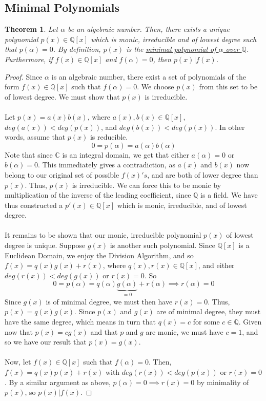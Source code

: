 \documentclass{article}
\newcommand{\C}{\mathbb{C}}
\newcommand{\Q}{\mathbb{Q}}
\newtheorem{theorem}{Theorem}[subsection]
\begin{document}
\subsection{Minimal Polynomials}
\begin{theorem}
Let $\alpha$ be an algebraic number. Then, there exists a unique polynomial $p(x)\in\Q[x]$ which is monic, irreducible and of lowest degree such that $p(\alpha)=0$. By definition, $p(x)$ is the \underline{minimal polynomial of $\alpha$ over $\Q$}. Furthermore, if $f(x)\in\Q[x]$ and $f(\alpha)=0$, then $p(x)|f(x)$.
\end{theorem}
\begin{proof}
Since $\alpha$ is an algebraic number, there exist a set of polynomials of the form $f(x)\in\Q[x]$ such that $f(\alpha)=0$. We choose $p(x)$ from this set to be of lowest degree. We must show that $p(x)$ is irreducible.\\
\\
Let $p(x)=a(x)b(x)$, where $a(x),b(x)\in\Q[x]$, $deg(a(x))<deg(p(x))$, and $deg(b(x))<deg(p(x))$. In other words, assume that $p(x)$ is reducible.
$$0=p(\alpha)=a(\alpha)b(\alpha)$$
Note that since $\C$ is an integral domain, we get that either $a(\alpha)=0$ or $b(\alpha)=0$. This immediately gives a contradiction, as $a(x)$ and $b(x)$ now belong to our original set of possible $f(x)'s$, and are both of lower degree than $p(x)$. Thus, $p(x)$ is irreducible. We can force this to be monic by multiplication of the inverse of the leading coefficient, since $\Q$ is a field. We have thus constructed a $p'(x)\in\Q[x]$ which is monic, irreducible, and of lowest degree. \\
\\
It remains to be shown that our monic, irreducible polynomial $p(x)$ of lowest degree is unique. Suppose $g(x)$ is another such polynomial. Since $\Q[x]$ is a Euclidean Domain, we enjoy the Division Algorithm, and so $f(x)=q(x)g(x)+r(x)$, where $q(x),r(x)\in\Q[x]$, and either $deg(r(x))<deg(g(x))$ or $r(x)=0$.
So 
$$0=p(\alpha)=q(\alpha)\underbrace{g(\alpha)}_{=0}+r(\alpha)\implies r(\alpha)=0$$
Since $g(x)$ is of minimal degree, we must then have $r(x)=0$. Thus, $p(x)=q(x)g(x)$. Since $p(x)$ and $g(x)$ are of minimal degree, they must have the same degree, which means in turn that $q(x)=c$ for some $c\in\Q$. Given now that $p(x)=cg(x)$ and that $p$ and $g$ are monic, we must have $c=1$, and so we have our result that $p(x)=g(x)$.\\
\\
Now, let $f(x)\in\Q[x]$ such that $f(\alpha)=0$. Then, $f(x)=q(x)p(x)+r(x)$ with $deg(r(x))<deg(p(x))$ or $r(x)=0$. By a similar argument as above, $p(\alpha)=0\implies r(x)=0$ by minimality of $p(x)$, so $p(x)|f(x)$.
\end{proof}
\end{document}
